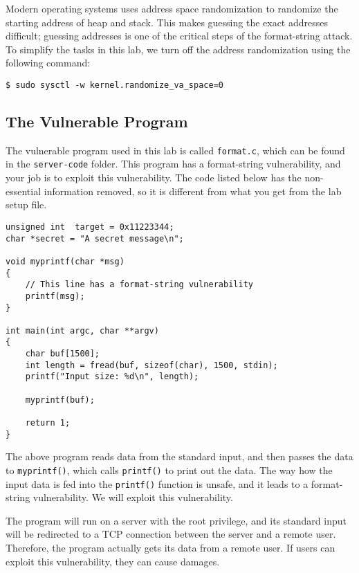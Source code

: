 Modern operating systems uses address space
randomization to randomize the starting address of heap and
stack. This makes guessing the exact addresses difficult; guessing
addresses is one of the critical steps of the format-string attack.
To simplify the tasks in this lab, we turn off the address randomization
using the following command: 

\begin{lstlisting}
$ sudo sysctl -w kernel.randomize_va_space=0
\end{lstlisting}


\subsection{The Vulnerable Program}
\label{sec:vulnerable_program}

The vulnerable program used in this lab is called
\texttt{format.c}, which can be found in the \texttt{server-code} folder.
This program has a format-string vulnerability,
and your job is to exploit this vulnerability.
The code listed below has the non-essential information removed,
so it is different from what you get from the lab setup file.

\begin{lstlisting}[label=format:code, 
       caption={The vulnerable program \texttt{format.c} (with non-essential information removed)}]
unsigned int  target = 0x11223344;
char *secret = "A secret message\n";

void myprintf(char *msg)
{
    // This line has a format-string vulnerability
    printf(msg);
}

int main(int argc, char **argv)
{
    char buf[1500];
    int length = fread(buf, sizeof(char), 1500, stdin);
    printf("Input size: %d\n", length);

    myprintf(buf);

    return 1;
}
\end{lstlisting}

The above program reads data from the standard input, 
and then passes the data to \texttt{myprintf()}, 
which calls \texttt{printf()} to print out the data. 
The way how the input data is fed into the \texttt{printf()} function
is unsafe, and it leads to a format-string vulnerability. 
We will exploit this vulnerability. 

The program will run on a server with the root privilege, and its
standard input will be redirected to a TCP connection between the
server and a remote user.
Therefore, the program actually gets its data from a remote user.
If users can exploit this vulnerability, they can cause damages.


